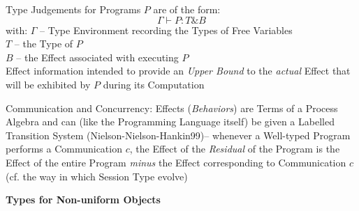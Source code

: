 Type Judgements for Programs $P$ are of the form:
\[
  \Gamma \vdash P : T\&B
\]
with:
$\Gamma$ -- Type Environment recording the Types of Free Variables \\
$T$ -- the Type of $P$ \\
$B$ -- the Effect associated with executing $P$ \\

Effect information intended to provide an \emph{Upper Bound} to the
\emph{actual} Effect that will be exhibited by $P$ during its
Computation

Communication and Concurrency: Effects (\emph{Behaviors}) are Terms of
a Process Algebra and can (like the Programming Language itself) be
given a Labelled Transition System (Nielson-Nielson-Hankin99)--
whenever a Well-typed Program performs a Communication $c$, the Effect
of the \emph{Residual} of the Program is the Effect of the entire
Program \emph{minus} the Effect corresponding to Communication $c$
(cf. the way in which Session Type evolve)


\textbf{Types for Non-uniform Objects}

